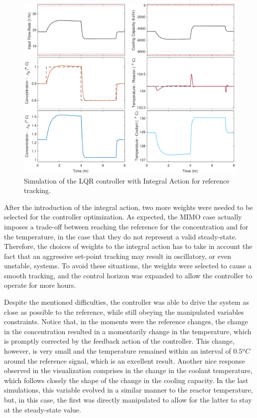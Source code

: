 \documentclass[a4paper,11pt]{book}
\numberwithin{figure}{chapter}
\numberwithin{equation}{chapter}
\numberwithin{table}{chapter}
\theoremstyle{definition}
\begin{document}
\begin{figure}[ht] \centering
	\includegraphics[width=\textwidth]{chapter7/lqri01}
	
	\caption{Simulation of the LQR controller with Integral Action for reference tracking.}
	\label{fig:lqri01}
\end{figure}

After the introduction of the integral action, two more weights were needed to be selected for the controller optimization. As expected, the MIMO case actually imposes a trade-off between reaching the reference for the concentration and for the temperature, in the case that they do not represent a valid steady-state. Therefore, the choices of weights to the integral action has to take in account the fact that an aggressive set-point tracking may result in oscillatory, or even unstable, systems. To avoid these situations, the weights were selected to cause a smooth tracking, and the control horizon was expanded to allow the controller to operate for more hours. 

Despite the mentioned difficulties, the controller was able to drive the system as close as possible to the reference, while still obeying the manipulated variables constraints. Notice that, in the moments were the reference changes, the change in the concentration resulted in a momentarily change in the temperature, which is promptly corrected by the feedback action of the controller. This change, however, is very small and the temperature remained within an interval of $0.5ºC$ around the reference signal, which is an excellent result. Another nice response observed in the visualization comprises in the change in the coolant temperature, which follows closely the shape of the change in the cooling capacity. In the last simulations, this variable evolved in a similar manner to the reactor temperature, but, in this case, the first was directly manipulated to allow for the latter to stay at the steady-state value.
\end{document}
